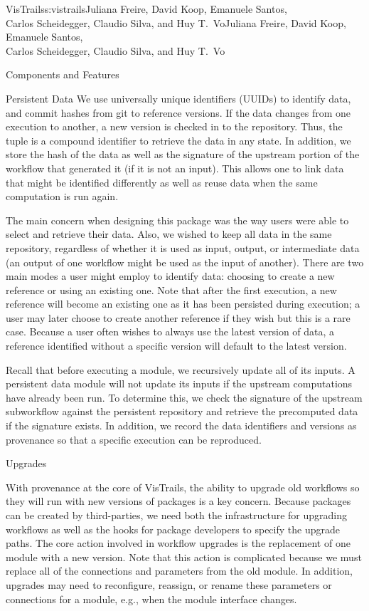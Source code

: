 \begin{aosachaptertoc}{VisTrails}{s:vistrails}{Juliana Freire, David Koop, Emanuele Santos, \\ Carlos Scheidegger, Claudio Silva, and Huy T.\ Vo}{Juliana Freire, David Koop, Emanuele Santos, \\ \hspace*{0.9cm} Carlos Scheidegger, Claudio Silva, and Huy T.\ Vo}
\begin{aosasect1}{Components and Features}
\begin{aosasect2}{Persistent Data}
We use universally unique identifiers (UUIDs) to identify data, and
commit hashes from git to reference versions.  If the data changes
from one execution to another, a new version is checked in to the
repository.  Thus, the  tuple is a compound identifier
to retrieve the data in any state.  In addition, we store the hash of
the data as well as the signature of the upstream portion of the
workflow that generated it (if it is not an input).  This allows one
to link data that might be identified differently as well as reuse
data when the same computation is run again.

The main concern when designing this package was the way users were
able to select and retrieve their data.  Also, we wished to keep all
data in the same repository, regardless of whether it is used as
input, output, or intermediate data (an output of one workflow might
be used as the input of another).  There are two main modes a user
might employ to identify data: choosing to create a new reference or
using an existing one.  Note that after the first execution, a new
reference will become an existing one as it has been persisted during
execution; a user may later choose to create another reference if
they wish but this is a rare case.  Because a user often wishes to
always use the latest version of data, a reference identified without
a specific version will default to the latest version.

Recall that before executing a module, we recursively update all of
its inputs.  A persistent data module will not update its inputs if
the upstream computations have already been run.  To determine this,
we check the signature of the upstream subworkflow against the
persistent repository and retrieve the precomputed data if the
signature exists.  In addition, we record the data identifiers and
versions as provenance so that a specific execution can be reproduced.

\end{aosasect2}

\begin{aosasect2}{Upgrades}
\label{sec.vistrails.upgrades}

With provenance at the core of VisTrails, the ability to upgrade old
workflows so they will run with new versions of packages is a key
concern.  Because packages can be created by third-parties, we need
both the infrastructure for upgrading workflows as well as the hooks
for package developers to specify the upgrade paths.  The core action
involved in workflow upgrades is the replacement of one module with a
new version.  Note that this action is complicated because we must
replace all of the connections and parameters from the old module.  In
addition, upgrades may need to reconfigure, reassign, or rename these
parameters or connections for a module, e.g., when the module
interface changes.


\end{aosasect2}
\end{aosasect1}
\end{aosachaptertoc}
